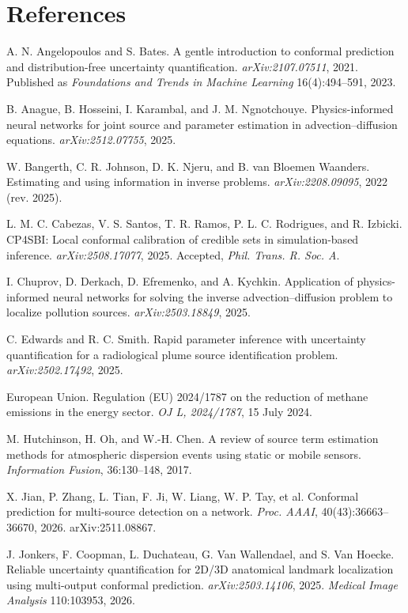 \documentclass{article}
\begin{document}
\section*{References}
{\small
\begin{list}{}{\setlength{\leftmargin}{1.5em}\setlength{\itemindent}{-1.5em}\setlength{\itemsep}{2pt}\setlength{\parsep}{0pt}}
\item A. N. Angelopoulos and S. Bates. A gentle introduction to conformal prediction and distribution-free uncertainty quantification. \emph{arXiv:2107.07511}, 2021. Published as \emph{Foundations and Trends in Machine Learning} 16(4):494--591, 2023.
\item B. Anague, B. Hosseini, I. Karambal, and J. M. Ngnotchouye. Physics-informed neural networks for joint source and parameter estimation in advection--diffusion equations. \emph{arXiv:2512.07755}, 2025.
\item W. Bangerth, C. R. Johnson, D. K. Njeru, and B. van Bloemen Waanders. Estimating and using information in inverse problems. \emph{arXiv:2208.09095}, 2022 (rev. 2025).
\item L. M. C. Cabezas, V. S. Santos, T. R. Ramos, P. L. C. Rodrigues, and R. Izbicki. CP4SBI: Local conformal calibration of credible sets in simulation-based inference. \emph{arXiv:2508.17077}, 2025. Accepted, \emph{Phil. Trans. R. Soc. A}.
\item I. Chuprov, D. Derkach, D. Efremenko, and A. Kychkin. Application of physics-informed neural networks for solving the inverse advection--diffusion problem to localize pollution sources. \emph{arXiv:2503.18849}, 2025.
\item C. Edwards and R. C. Smith. Rapid parameter inference with uncertainty quantification for a radiological plume source identification problem. \emph{arXiv:2502.17492}, 2025.
\item European Union. Regulation (EU) 2024/1787 on the reduction of methane emissions in the energy sector. \emph{OJ L, 2024/1787}, 15 July 2024.
\item M. Hutchinson, H. Oh, and W.-H. Chen. A review of source term estimation methods for atmospheric dispersion events using static or mobile sensors. \emph{Information Fusion}, 36:130--148, 2017.
\item X. Jian, P. Zhang, L. Tian, F. Ji, W. Liang, W. P. Tay, et al. Conformal prediction for multi-source detection on a network. \emph{Proc. AAAI}, 40(43):36663--36670, 2026. arXiv:2511.08867.
\item J. Jonkers, F. Coopman, L. Duchateau, G. Van Wallendael, and S. Van Hoecke. Reliable uncertainty quantification for 2D/3D anatomical landmark localization using multi-output conformal prediction. \emph{arXiv:2503.14106}, 2025. \emph{Medical Image Analysis} 110:103953, 2026.

\end{list}}
\end{document}
